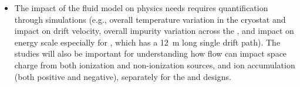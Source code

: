 \begin{itemize}
\item The impact of the fluid model on physics needs requires quantification through  simulations (e.g., overall temperature variation in the cryostat and impact on drift velocity, overall impurity variation across the \detmodule{}, and impact on energy scale especially for , which has a \SI{12}{\m} long single drift path). The  studies will also be important for understanding how \lar flow can impact space charge from both ionization and non-ionization sources, and ion accumulation (both positive and negative), separately for the  and  designs. 

\end{itemize}


